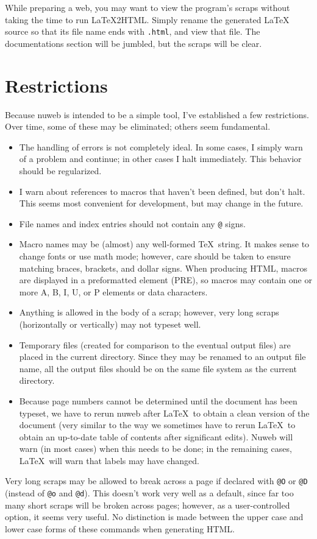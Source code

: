 \documentclass{report}
\begin{document}
While preparing a web, you may want to view the program's scraps without
taking the time to run {\LaTeX}2HTML\@.  Simply rename the generated
{\LaTeX} source so that its file name ends with \verb|.html|, and view
that file.  The documentations section will be jumbled, but the
scraps will be clear.

\section{Restrictions}

Because nuweb is intended to be a simple tool, I've established a few
restrictions. Over time, some of these may be eliminated; others seem
fundamental.
\begin{itemize}
\item The handling of errors is not completely ideal. In some cases, I
  simply warn of a problem and continue; in other cases I halt
  immediately. This behavior should be regularized.
\item I warn about references to macros that haven't been defined, but
  don't halt. This seems most convenient for development, but may change
  in the future.
\item File names and index entries should not contain any \verb|@|
  signs.
\item Macro names may be (almost) any well-formed \TeX\ string.
  It makes sense to change fonts or use math mode; however, care should
  be taken to ensure matching braces, brackets, and dollar signs.
  When producing HTML, macros are displayed in a preformatted element
  (PRE), so macros may contain one or more A, B, I, U, or P elements
  or data characters.
\item Anything is allowed in the body of a scrap; however, very
  long scraps (horizontally or vertically) may not typeset well.
\item Temporary files (created for comparison to the eventual
  output files) are placed in the current directory. Since they may be
  renamed to an output file name, all the output files should be on the
  same file system as the current directory.
\item Because page numbers cannot be determined until the document has
  been typeset, we have to rerun nuweb after \LaTeX\ to obtain a clean
  version of the document (very similar to the way we sometimes have
  to rerun \LaTeX\ to obtain an up-to-date table of contents after
  significant edits).  Nuweb will warn (in most cases) when this needs
  to be done; in the remaining cases, \LaTeX\ will warn that labels
  may have changed.
\end{itemize}
Very long scraps may be allowed to break across a page if declared
with \verb|@O| or \verb|@D| (instead of \verb|@o| and \verb|@d|).
This doesn't work very well as a default, since far too many short
scraps will be broken across pages; however, as a user-controlled
option, it seems very useful.  No distinction is made between the
upper case and lower case forms of these commands when generating
HTML\@.
\end{document}
